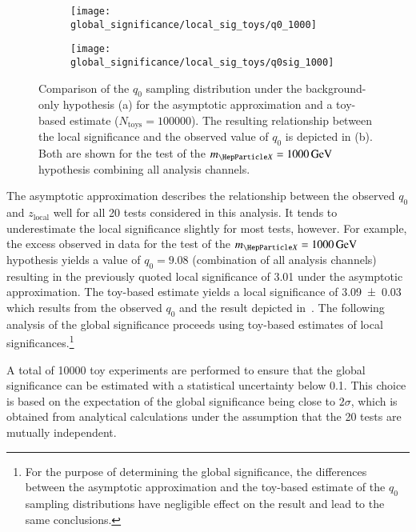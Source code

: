 \begin{figure}[htbp]
  \centering

  \begin{subfigure}{0.485\textwidth}
    \centering

    \texttt{[image: global\_significance/local\_sig\_toys/q0\_1000]}
    \subcaption{}
  \end{subfigure}\hfill%
  \begin{subfigure}{0.485\textwidth}
    \centering
    \texttt{[image: global\_significance/local\_sig\_toys/q0sig\_1000]}
    \subcaption{}%
    \label{fig:q0_samplingdist_q0sig}
  \end{subfigure}

  \caption{Comparison of the $q_0$ sampling distribution under the
    background-only hypothesis (a) for the asymptotic approximation and a
    toy-based estimate ($N_{\text{toys}} = \num{100000}$). The resulting
    relationship between the local significance and the observed value of $q_0$
    is depicted in (b). Both are shown for the test of the
    $\mX = \SI{1000}{\GeV}$ hypothesis combining all analysis channels.}%
  \label{fig:q0_samplingdist}
\end{figure}

The asymptotic approximation describes the relationship between the observed
$q_0$ and $z_{\text{local}}$ well for all 20 tests considered in this
analysis. It tends to underestimate the local significance slightly for most
tests, however. For example, the excess observed in data for the test of the
$\mX = \SI{1000}{\GeV}$ hypothesis yields a value of $q_0 = \num{9.08}$
(combination of all analysis channels) resulting in the previously quoted local
significance of \num{3.01} under the asymptotic approximation. The toy-based
estimate yields a local significance of \num{3.09 +- 0.03} which results from
the observed $q_0$ and the result depicted
in~. The following analysis of the global
significance proceeds using toy-based estimates of local
significances.\footnote{For the purpose of determining the global significance,
  the differences between the asymptotic approximation and the toy-based
  estimate of the $q_0$ sampling distributions have negligible effect on the
  result and lead to the same conclusions.}

A total of \num{10000} toy experiments are performed to ensure that the global
significance can be estimated with a statistical uncertainty below
\num{0.1}. This choice is based on the expectation of the global significance
being close to $2\sigma$, which is obtained from analytical calculations under
the assumption that the 20 tests are mutually independent.


